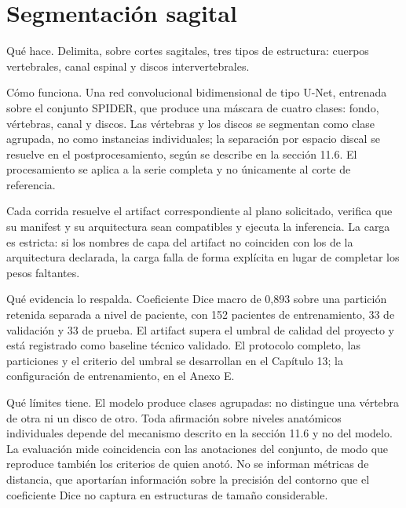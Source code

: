 \section{Segmentación sagital}

Qué hace. Delimita, sobre cortes sagitales, tres tipos de estructura: cuerpos vertebrales, canal espinal y discos intervertebrales.

Cómo funciona. Una red convolucional bidimensional de tipo U-Net, entrenada sobre el conjunto SPIDER, que produce una máscara de cuatro clases: fondo, vértebras, canal y discos. Las vértebras y los discos se segmentan como clase agrupada, no como instancias individuales; la separación por espacio discal se resuelve en el postprocesamiento, según se describe en la sección 11.6. El procesamiento se aplica a la serie completa y no únicamente al corte de referencia.

Cada corrida resuelve el artifact correspondiente al plano solicitado, verifica que su manifest y su arquitectura sean compatibles y ejecuta la inferencia. La carga es estricta: si los nombres de capa del artifact no coinciden con los de la arquitectura declarada, la carga falla de forma explícita en lugar de completar los pesos faltantes.


Qué evidencia lo respalda. Coeficiente Dice macro de 0,893 sobre una partición retenida separada a nivel de paciente, con 152 pacientes de entrenamiento, 33 de validación y 33 de prueba. El artifact supera el umbral de calidad del proyecto y está registrado como baseline técnico validado. El protocolo completo, las particiones y el criterio del umbral se desarrollan en el Capítulo 13; la configuración de entrenamiento, en el Anexo E.

Qué límites tiene. El modelo produce clases agrupadas: no distingue una vértebra de otra ni un disco de otro. Toda afirmación sobre niveles anatómicos individuales depende del mecanismo descrito en la sección 11.6 y no del modelo. La evaluación mide coincidencia con las anotaciones del conjunto, de modo que reproduce también los criterios de quien anotó. No se informan métricas de distancia, que aportarían información sobre la precisión del contorno que el coeficiente Dice no captura en estructuras de tamaño considerable.

